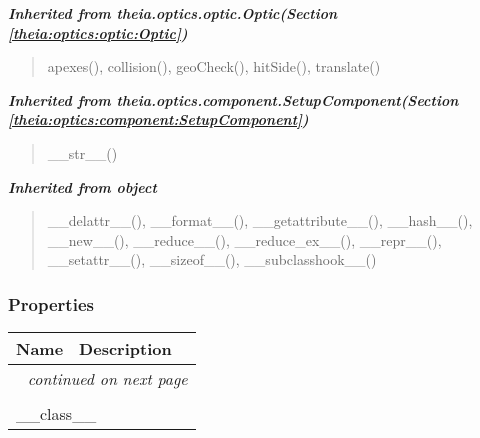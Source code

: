 \large{\textbf{\textit{Inherited from theia.optics.optic.Optic\textit{(Section \ref{theia:optics:optic:Optic})}}}}

\begin{quote}
apexes(), collision(), geoCheck(), hitSide(), translate()
\end{quote}

\large{\textbf{\textit{Inherited from theia.optics.component.SetupComponent\textit{(Section \ref{theia:optics:component:SetupComponent})}}}}

\begin{quote}
\_\_str\_\_()
\end{quote}

\large{\textbf{\textit{Inherited from object}}}

\begin{quote}
\_\_delattr\_\_(), \_\_format\_\_(), \_\_getattribute\_\_(), \_\_hash\_\_(), \_\_new\_\_(), \_\_reduce\_\_(), \_\_reduce\_ex\_\_(), \_\_repr\_\_(), \_\_setattr\_\_(), \_\_sizeof\_\_(), \_\_subclasshook\_\_()
\end{quote}


  \subsubsection{Properties}

    \vspace{-1cm}
\hspace{\varindent}\begin{longtable}{|p{\varnamewidth}|p{\vardescrwidth}|l}
\cline{1-2}
\cline{1-2} \centering \textbf{Name} & \centering \textbf{Description}& \\
\cline{1-2}
\endhead\cline{1-2}\multicolumn{3}{r}{\small\textit{continued on next page}}\\\endfoot\cline{1-2}
\endlastfoot\multicolumn{2}{|l|}{\textit{Inherited from object}}\\
\multicolumn{2}{|p{\varwidth}|}{\raggedright \_\_class\_\_}\\
\cline{1-2}
\end{longtable}



